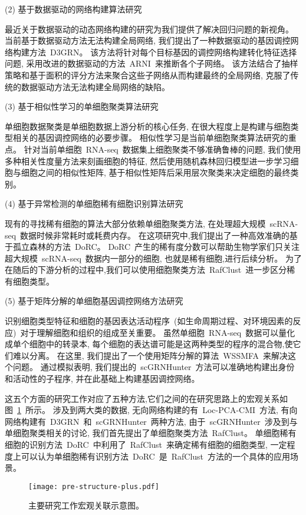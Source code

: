 (2) 基于数据驱动的网络构建算法研究

最近关于数据驱动的动态网络构建的研究为我们提供了解决回归问题的新视角。
当前基于数据驱动方法无法构建全局网络,
我们提出了一种数据驱动的基因调控网络构建方法~D3GRN。
该方法将针对每个目标基因的调控网络构建转化特征选择问题,
采用改进的数据驱动的方法~ARNI~来推断各个子网络。
该方法结合了抽样策略和基于面积的评分方法来聚合这些子网络从而构建最终的全局网络,
克服了传统的数据驱动方法无法构建全局网络的缺陷。


(3) 基于相似性学习的单细胞聚类算法研究

单细胞数据聚类是单细胞数据上游分析的核心任务, 
在很大程度上是构建与细胞类型相关的基因调控网络的必要步骤。
相似性学习是当前单细胞聚类算法研究的重点。
针对当前单细胞~RNA-seq~数据集上细胞聚类不够准确鲁棒的问题,
我们使用多种相关性度量方法来刻画细胞的特征, 
然后使用随机森林回归模型进一步学习细胞与细胞之间的相似性矩阵,
基于相似性矩阵后采用层次聚类来决定细胞的最终类别。

(4) 基于异常检测的单细胞稀有细胞识别算法研究

现有的寻找稀有细胞的算法大部分依赖单细胞聚类方法,
在处理超大规模~scRNA-seq~数据时候非常耗时或耗费内存。
在这项研究中,我们提出了一种高效准确的基于孤立森林的方法~DoRC。
DoRC~产生的稀有度分数可以帮助生物学家们只关注超大规模~scRNA-seq~数据内一部分的细胞, 也就是稀有细胞,进行后续分析。
为了在随后的下游分析的过程中,我们可以使用细胞聚类方法~RafClust~进一步区分稀有细胞类型。

(5) 基于矩阵分解的单细胞基因调控网络方法研究

识别细胞类型特征和细胞的基因表达活动程序~(如生命周期过程、对环境因素的反应)~对于理解细胞和组织的组成至关重要。
虽然单细胞~RNA-seq~数据可以量化成单个细胞中的转录本,
每个细胞的表达谱可能是这两种类型的程序的混合物,使它们难以分离。
在这里, 我们提出了一个使用矩阵分解的算法~WSSMFA~来解决这个问题。
通过模拟表明, 我们提出的~scGRNHunter~方法可以准确地构建出身份和活动性的子程序, 
并在此基础上构建基因调控网络。

这五个方面的研究工作对应了五种方法,它们之间的在研究思路上的宏观关系如图~\ref{fig:pre-structure}~所示。
涉及到两大类的数据, 无向网络构建的有~Loc-PCA-CMI~方法, 有向网络构建有~D3GRN~和~scGRNHunter~两种方法, 
由于~scGRNHunter~涉及到与单细胞聚类相关的讨论, 我们首先提出了单细胞聚类方法~RafClust。
单细胞稀有细胞的识别方法~DoRC~中利用了~RafClust~来确定稀有细胞的细胞类型,
一定程度上可以认为单细胞稀有识别方法~DoRC~是~RafClust~方法的一个具体的应用场景。
\begin{figure}[!htbp]
    \centering
    \texttt{[image: pre-structure-plus.pdf]}
    \caption{主要研究工作宏观关联示意图。
    }
    \label{fig:pre-structure}
\end{figure}

